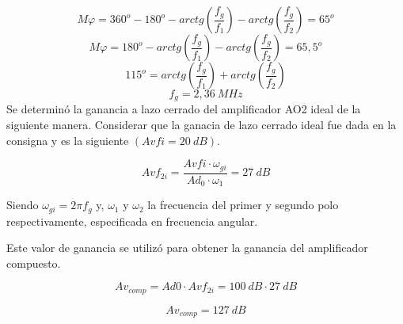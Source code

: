 \begin{equation}
    M \varphi = 360^o - 180^o - arctg \left( \frac{f_g}{f_1} \right) - arctg \left( \frac{f_g}{f_2} \right) = 65^o
\end{equation}
\begin{equation}
    M \varphi = 180^o - arctg \left( \frac{f_g}{f_1} \right) - arctg \left( \frac{f_g}{f_2} \right) = 65,5^o
\end{equation}
\begin{equation}
    115^o = arctg \left( \frac{f_g}{f_1} \right) + arctg \left( \frac{f_g}{f_2} \right)
\end{equation}
\begin{equation}
    \boxed{
    f_g = 2,36~MHz
    }
\end{equation}
\bigskip
\hspace{1mm} Se determinó la ganancia a lazo cerrado del amplificador AO2 ideal de la siguiente manera. Considerar que la ganacia de lazo cerrado ideal fue dada en la consigna y es la siguiente \((Avfi=20~dB)\).


\begin{equation}
    Avf_{2i}=\frac{Avfi \cdot \omega_{gi}}{Ad_0 \cdot \omega_1} = 27~dB
\end{equation}

\bigskip
\hspace{1mm} Siendo \( \omega _{gi} = 2\pi f_g \)
y, \( \omega _1 \) y  \(\omega _2\) la frecuencia del primer y segundo polo respectivamente, especificada en frecuencia angular.


\bigskip
\hspace{1mm} Este valor de ganancia se utilizó para obtener la ganancia del amplificador compuesto.

\begin{equation}
    Av_{comp}=Ad0\cdot Avf_{2i}=100~dB \cdot 27~dB
\end{equation}

\begin{equation}
    \boxed{
    Av_{comp} = 127~dB
    }
\end{equation}

